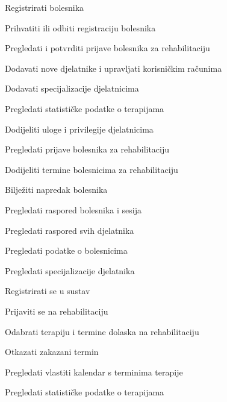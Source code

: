 \documentclass{article}
\begin{document}
\begin{packed_enum}
\item {}
\begin{packed_enum}
\item Registrirati bolesnika
\item Prihvatiti ili odbiti registraciju bolesnika
\item Pregledati i potvrditi prijave bolesnika za rehabilitaciju
\item Dodavati nove djelatnike i upravljati korisničkim računima
\item Dodavati specijalizacije djelatnicima
\item Pregledati statističke podatke o terapijama
\item Dodijeliti uloge i privilegije djelatnicima
\end{packed_enum}
\vspace{1em} %

\item {}
\begin{packed_enum}
\item Pregledati prijave bolesnika za rehabilitaciju
\item Dodijeliti termine bolesnicima za rehabilitaciju
\item Bilježiti napredak bolesnika
\item Pregledati raspored bolesnika i sesija
\item Pregledati raspored svih djelatnika
\item Pregledati podatke o bolesnicima
\item Pregledati specijalizacije djelatnika
\end{packed_enum}
\vspace{1em} %

\item {}
\begin{packed_enum}
\item Registrirati se u sustav
\item Prijaviti se na rehabilitaciju
\item Odabrati terapiju i termine dolaska na rehabilitaciju
\item Otkazati zakazani termin
\item Pregledati vlastiti kalendar s terminima terapije
\item Pregledati statističke podatke o terapijama
\end{packed_enum}
\end{packed_enum}
\vspace{2em} %
\end{document}
